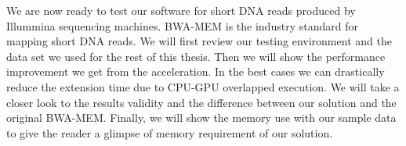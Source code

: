 We are now ready to test our software for short DNA reads produced by Illummina sequencing machines. BWA-MEM is the industry standard for mapping short DNA reads. We will first review our testing environment and the data set we used for the rest of this thesis. Then we will show the performance improvement we get from the acceleration. In the best cases we can drastically reduce the extension time due to CPU-GPU overlapped execution. We will take a closer look to the results validity and the difference between our solution and the original BWA-MEM. Finally, we will show the memory use with our sample data to give the reader a glimpse of memory requirement of our solution.